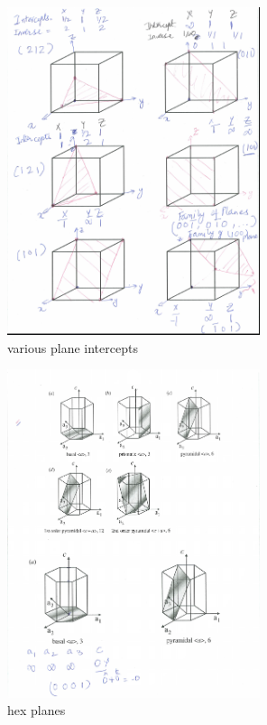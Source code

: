 \documentclass{article}
\begin{document}
\begin{figure}[h!]
	\centering
	\includegraphics[width=0.66\textwidth]{assets/33eead8c.png}
	\caption{various plane intercepts}
\end{figure}

\begin{figure}[h!]
	\centering
	\includegraphics[width=0.66\textwidth]{assets/71838378.png}
	\caption{hex planes}
\end{figure}
\end{document}
